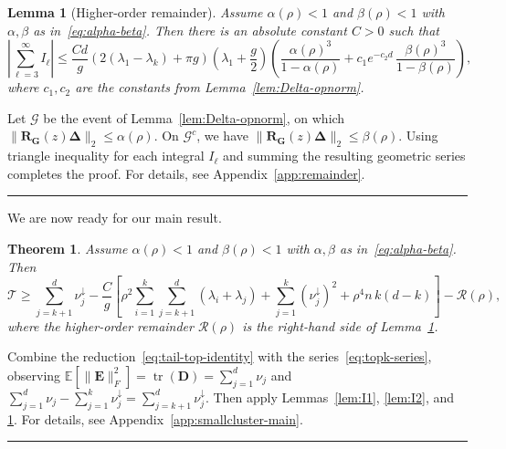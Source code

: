 \documentclass{article}
\newcommand{\twonorm}[1]{\|#1\|_2}
\newcommand{\Ex}[1]{\mbox{}\mathbb{E}\left[#1\right]}
\newcommand{\Db}{\mathbf{D}}
\newcommand{\Eb}{\mathbf{E}}
\newcommand{\Gb}{\mathbf{G}}
\newcommand{\Rb}{\mathbf{R}}
\newcommand{\Gcal}{\mathcal{G}}
\newcommand{\Rcal}{\mathcal{R}}
\newcommand{\Tcal}{\mathcal{T}}
\newcommand{\BlackBox}{\rule{1.5ex}{1.5ex}}  %
\newenvironment{proof}{\par\noindent{\bf Proof\ }}{\hfill\BlackBox\par\medskip}
\newtheorem{theorem}{Theorem}
\newtheorem{lemma}{Lemma}[section]
\newcommand{\tr}{\mathop{\mathrm{tr}}}
\newcommand{\rbr}[1]{\left(#1\right)}
\newcommand{\sbr}[1]{\left[#1\right]}
\newcommand{\abr}[1]{\left|#1\right|}
\newcommand{\Deltab}{\boldsymbol{\Delta}}
\begin{document}
\begin{lemma}[Higher-order remainder]\label{lem:remainder}
Assume $\alpha(\rho) < 1$ and $\beta(\rho) < 1$ with $\alpha,\beta$ as in~\eqref{eq:alpha-beta}. Then there is an absolute constant $C > 0$ such that
\begin{equation*}
    \abr{\sum_{\ell=3}^{\infty} I_\ell} \le \frac{Cd}{g}\rbr{2(\lambda_1 - \lambda_k) + \pi g}\rbr{\lambda_1 + \frac{g}{2}}\rbr{\frac{\alpha(\rho)^3}{1 - \alpha(\rho)} + c_1 e^{-c_2 d}\,\frac{\beta(\rho)^3}{1 - \beta(\rho)}},
\end{equation*}
where $c_1, c_2$ are the constants from Lemma~\ref{lem:Delta-opnorm}.
\end{lemma}

\begin{proof}
    Let $\Gcal$ be the event of Lemma~\ref{lem:Delta-opnorm}, on which $\twonorm{\Rb_\Gb(z)\Deltab}\le \alpha(\rho)$. On $\Gcal^c$, we have $\twonorm{\Rb_\Gb(z)\Deltab}\le \beta(\rho)$. Using triangle inequality for each integral $I_\ell$ and summing the resulting geometric series completes the proof. 
   For details, see Appendix~\ref{app:remainder}.
\end{proof}


We are now ready for our main result.

\begin{theorem}\label{thm:smallcluster-main}
Assume $\alpha(\rho) < 1$ and $\beta(\rho) < 1$ with $\alpha, \beta$ as in~\eqref{eq:alpha-beta}. Then
\begin{equation*}
    \Tcal \ge \sum_{j=k+1}^{d}\nu_j^\downarrow - \frac{C}{g}\sbr{\rho^2 \sum_{i=1}^{k}\sum_{j=k+1}^{d}(\lambda_i + \lambda_j) + \sum_{j=1}^{k}\rbr{\nu_j^\downarrow}^2 + \rho^4 n\, k(d-k)} - \Rcal(\rho),
\end{equation*}
where the higher-order remainder $\Rcal(\rho)$ is the right-hand side of Lemma~\ref{lem:remainder}.
\end{theorem}

\begin{proof}
Combine the reduction~\eqref{eq:tail-top-identity} with the series~\eqref{eq:topk-series}, observing $\Ex{\|\Eb\|_F^2} = \tr(\Db) = \sum_{j=1}^{d}\nu_j$ and $\sum_{j=1}^{d}\nu_j - \sum_{j=1}^{k}\nu_j^\downarrow = \sum_{j=k+1}^{d}\nu_j^\downarrow$. Then apply Lemmas~\ref{lem:I1}, \ref{lem:I2}, and \ref{lem:remainder}. For details, see Appendix~\ref{app:smallcluster-main}.    
\end{proof}
\end{document}
